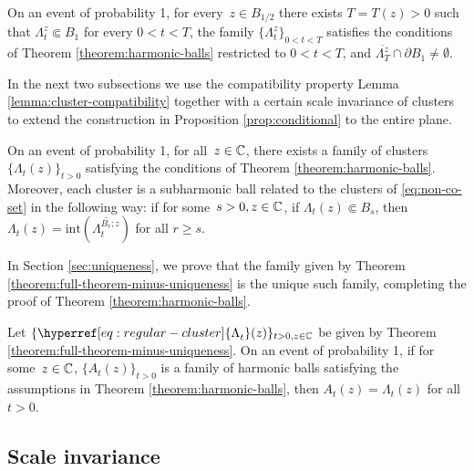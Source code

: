 \documentclass[12pt]{amsart}
\numberwithin{equation}{section}
\newcommand{\cluster}[2]{\hyperref[eq:non-co-set]{\mathit{\Lambda}^{#1}_{#2}}}
\newcommand{\regcluster}[2]{\hyperref[eq:regular-cluster]{\Lambda^{#1}_{#2}}}
\begin{document}
	
	\begin{prop} \label{prop:conditional}
		On an event of probability 1, for every~$z \in B_{1/2}$ there exists $T=T(z)>0$ such that ${\regcluster{z}{t}} \Subset B_1$ for every $0<t<T$, the family $\{{\regcluster{z}{t}}\}_{0 < t < T}$ satisfies the conditions of Theorem \ref{theorem:harmonic-balls} restricted to $0<t<T$, and $\overline{{\regcluster{z}{T}}} \cap \partial B_1 \neq \emptyset$.
	\end{prop}
	
	
	
	
	In the next two subsections we use the compatibility property Lemma \ref{lemma:cluster-compatibility} together with a certain scale invariance of clusters
	to extend the construction in Proposition \ref{prop:conditional} to the entire plane. 
	\begin{theorem} \label{theorem:full-theorem-minus-uniqueness}
		On an event of probability 1, for all~$z \in \mathbb{C}$, there exists a family of clusters $\{{\cluster{}{t}}(z)\}_{t > 0}$ 
		satisfying the conditions of Theorem \ref{theorem:harmonic-balls}. 
		Moreover, each cluster is a subharmonic ball related to the clusters of \eqref{eq:non-co-set} in the following way: 
		if for some~$s > 0, z \in \mathbb{C}$, if ${\regcluster{}{t}(z)} \Subset B_s$, then ${\regcluster{}{t}(z)} = \mathrm{int}(\overline{\cluster{B_r;z}{t}})$ for all $r \geq s$.
	\end{theorem}
	
	In Section \ref{sec:uniqueness}, we prove that the family given by Theorem \ref{theorem:full-theorem-minus-uniqueness} is the unique such family,
	completing the proof of Theorem \ref{theorem:harmonic-balls}. 
	\begin{prop} \label{prop:uniqueness}
		Let $\{{\regcluster{}{t}(z)}\}_{t > 0, z \in \C}$ be given by Theorem \ref{theorem:full-theorem-minus-uniqueness}. 
		On an event of probability 1, if for some~$z \in \mathbb{C}$,  $\{A_t(z)\}_{t > 0}$ is a family 
		of harmonic balls satisfying the assumptions in Theorem \ref{theorem:harmonic-balls}, 
		then $A_t(z)={\regcluster{}{t}(z)}$ for all $t> 0$.
	\end{prop}
	
	
	\subsection{Scale invariance}
	
\end{document}
